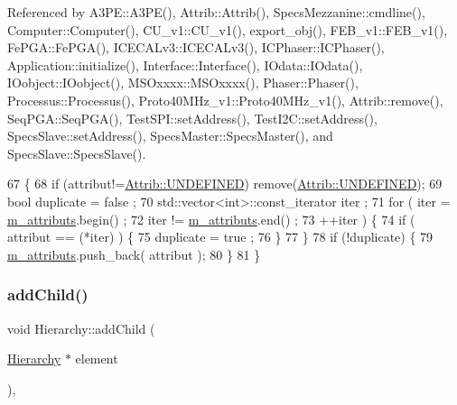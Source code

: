 Referenced by A3\+P\+E\+::\+A3\+P\+E(), Attrib\+::\+Attrib(), Specs\+Mezzanine\+::cmdline(), Computer\+::\+Computer(), C\+U\+\_\+v1\+::\+C\+U\+\_\+v1(), export\+\_\+obj(), F\+E\+B\+\_\+v1\+::\+F\+E\+B\+\_\+v1(), Fe\+P\+G\+A\+::\+Fe\+P\+G\+A(), I\+C\+E\+C\+A\+Lv3\+::\+I\+C\+E\+C\+A\+Lv3(), I\+C\+Phaser\+::\+I\+C\+Phaser(), Application\+::initialize(), Interface\+::\+Interface(), I\+Odata\+::\+I\+Odata(), I\+Oobject\+::\+I\+Oobject(), M\+S\+Oxxxx\+::\+M\+S\+Oxxxx(), Phaser\+::\+Phaser(), Processus\+::\+Processus(), Proto40\+M\+Hz\+\_\+v1\+::\+Proto40\+M\+Hz\+\_\+v1(), Attrib\+::remove(), Seq\+P\+G\+A\+::\+Seq\+P\+G\+A(), Test\+S\+P\+I\+::set\+Address(), Test\+I2\+C\+::set\+Address(), Specs\+Slave\+::set\+Address(), Specs\+Master\+::\+Specs\+Master(), and Specs\+Slave\+::\+Specs\+Slave().


\begin{DoxyCode}
67                             \{
68     \textcolor{keywordflow}{if} (attribut!=\hyperlink{classAttrib_a69e171d7cc6417835a5a306d3c764235a3a8da2ab97dda18aebab196fe4100531}{Attrib::UNDEFINED}) \textcolor{keyword}{remove}(\hyperlink{classAttrib_a69e171d7cc6417835a5a306d3c764235a3a8da2ab97dda18aebab196fe4100531}{Attrib::UNDEFINED});
69     \textcolor{keywordtype}{bool} duplicate = false ;
70     std::vector<int>::const\_iterator iter ;
71     \textcolor{keywordflow}{for} ( iter  = \hyperlink{classAttrib_ac4bd58a0cc6b38a3b711d609a3d3aacc}{m\_attributs}.begin() ;
72           iter != \hyperlink{classAttrib_ac4bd58a0cc6b38a3b711d609a3d3aacc}{m\_attributs}.end()   ;
73           ++iter ) \{
74       \textcolor{keywordflow}{if} ( attribut == (*iter) ) \{
75         duplicate = true ;
76       \}
77     \}
78     \textcolor{keywordflow}{if} (!duplicate) \{
79       \hyperlink{classAttrib_ac4bd58a0cc6b38a3b711d609a3d3aacc}{m\_attributs}.push\_back( attribut );
80     \}
81   \}
\end{DoxyCode}
\mbox{\label{classHierarchy_ad677774ff38fcb257c04a3a10d471fac}} 
\subsubsection{\texorpdfstring{add\+Child()}{addChild()}}
{\footnotesize\ttfamily void Hierarchy\+::add\+Child (\begin{DoxyParamCaption}\item[{\hyperlink{classHierarchy}{Hierarchy} $\ast$}]{element }\end{DoxyParamCaption})\hspace{0.3cm}{\ttfamily [virtual]}, {\ttfamily [inherited]}}



